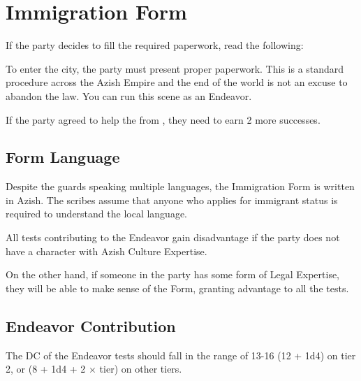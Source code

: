 \section{Immigration Form}
\label{sec:immigrationForm}

If the party decides to fill the required paperwork, read the following:


To enter the city, the party must present proper paperwork. This is a standard procedure across the Azish Empire and the end of the world is not an excuse to abandon the law. You can run this scene as an Endeavor.

 If the party agreed to help the \npcImmigrant{} from , they need to earn 2 more successes.



\subsection{Form Language}

Despite the guards speaking multiple languages, the Immigration Form is written in Azish. The scribes assume that anyone who applies for immigrant status is required to understand the local language. 

All tests contributing to the Endeavor gain disadvantage if the party does not have a character with Azish Culture Expertise.

On the other hand, if someone in the party has some form of Legal Expertise, they will be able to make sense of the Form, granting advantage to all the tests.

\subsection{Endeavor Contribution}

The DC of the Endeavor tests should fall in the range of 13-16 (12 + 1d4) on tier 2, or (8 + 1d4 + 2 $\times$ tier) on other tiers.

